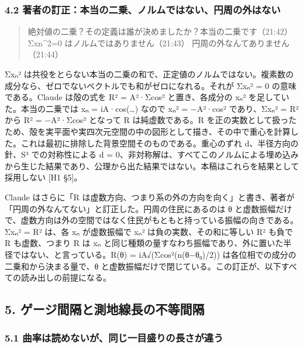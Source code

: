 \documentclass[
  a4paper,
]{ltjsarticle}
\begin{document}
\subsubsection{4.2
著者の訂正：本当の二乗、ノルムではない、円周の外はない}\label{ux8457ux8005ux306eux8a02ux6b63ux672cux5f53ux306eux4e8cux4e57ux30ceux30ebux30e0ux3067ux306fux306aux3044ux5186ux5468ux306eux5916ux306fux306aux3044}

\begin{quote}
絶対値の二乗？その定義は誰が決めましたか？本当の二乗です（21:42）
Σxn\^{}2=0 はノルムではありません（21:43）
円周の外なんてありません（21:44）
\end{quote}

Σxₙ²
は共役をとらない本当の二乗の和で、正定値のノルムではない。複素数の成分なら、ゼロでないベクトルでも和がゼロになれる。それが
Σxₙ² = 0 の意味である。Claude は殻の式を R² = A²·Σcos² と置き、各成分の
\textbar xₙ\textbar² を足していた。本当の二乗では xₙ = iA·cos(\ldots)
なので xₙ² = −A²·cos² であり、Σxₙ² = R² から R² = −A²·Σcos² となって R
は純虚数である。R
を正の実数として扱ったため、殻を実平面や実四次元空間の中の図形として描き、その中で重心を計算した。これは最初に排除した背景空間そのものである。重心のずれ
d、半径方向の針、S³ での対称性による d =
0、非対称解は、すべてこのノルムによる埋め込みから生じた結果であり、公理から出た結果ではない。本稿はこれらを結果として採用しない
{[}H1 §5{]}。

Claude はさらに「R
は虚数方向、つまり系の外の方向を向く」と書き、著者が「円周の外なんてない」と訂正した。円周の住民にあるのは
θ
と虚数振幅だけで、虚数方向は外の空間ではなく住民がもともと持っている振幅の向きである。Σxₙ²
= R² は、各 xₙ が虚数振幅で xₙ² は負の実数、その和に等しい R² も負で R
も虚数、つまり R は xₙ
と同じ種類の量すなわち振幅であり、外に置いた半径ではない、と言っている。R(θ)
= iA√(Σcos²(n(θ−θ₀)/2)) は各位相での成分の二乗和から決まる量で、θ
と虚数振幅だけで閉じている。この訂正が、以下すべての読み出しの前提になる。

\subsection{5.
ゲージ間隔と測地線長の不等間隔}\label{ux30b2ux30fcux30b8ux9593ux9694ux3068ux6e2cux5730ux7ddaux9577ux306eux4e0dux7b49ux9593ux9694}

\subsubsection{5.1
曲率は読めないが、同じ一目盛りの長さが違う}\label{ux66f2ux7387ux306fux8aadux3081ux306aux3044ux304cux540cux3058ux4e00ux76eeux76dbux308aux306eux9577ux3055ux304cux9055ux3046}
\end{document}
